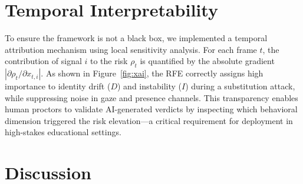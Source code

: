 \documentclass[conference]{IEEEtran}
\begin{document}
\begin{table}[!t]
\caption{System Complexity Breakdown (CPU)}
\label{tab:complexity}
\centering
{}
\end{table}

\section{Temporal Interpretability}

To ensure the framework is not a black box, we implemented a temporal attribution mechanism using local sensitivity analysis. For each frame $t$, the contribution of signal $i$ to the risk $\rho_t$ is quantified by the absolute gradient $\left| \partial \rho_t / \partial x_{t,i} \right|$. As shown in Figure~\ref{fig:xai}, the RFE correctly assigns high importance to identity drift ($D$) and instability ($I$) during a substitution attack, while suppressing noise in gaze and presence channels. This transparency enables human proctors to validate AI-generated verdicts by inspecting which behavioral dimension triggered the risk elevation---a critical requirement for deployment in high-stakes educational settings.

\section{Discussion}
\end{document}
